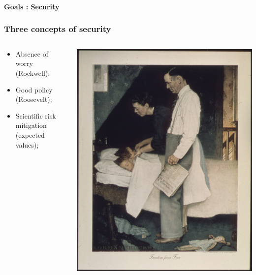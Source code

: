 \documentclass[aspectratio=169]{beamer}
\theoremstyle{principle}
\begin{document}
\begin{frame}

\begin{center}
\Huge\textbf{Goals : Security}\\
\end{center}

\end{frame}

\begin{frame}
\frametitle{Three concepts of security}
\begin{columns}
\begin{column}{0.5\textwidth}
\begin{itemize}
\item Absence of worry (Rockwell);
\bigskip
\bigskip
\bigskip
\item Good policy (Roosevelt);
\bigskip
\bigskip
\bigskip
\item Scientific risk mitigation (expected values);
\end{itemize}
\end{column}
\begin{column}{0.5\textwidth}
\includegraphics[scale=0.25]{Freedom_From_Fear.jpg}
\end{column}
\end{columns}

\end{frame}
\end{document}
